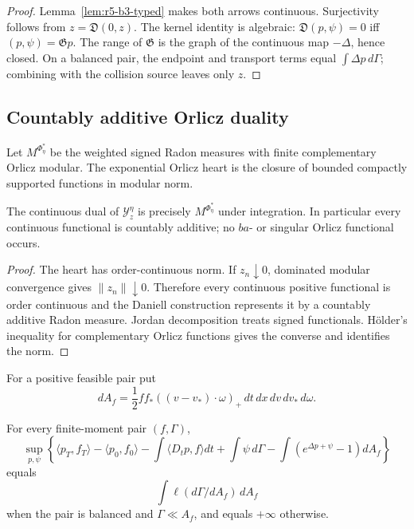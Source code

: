 \begin{proof}
Lemma~\ref{lem:r5-b3-typed} makes both arrows continuous.
Surjectivity follows from \(z={\mathfrak D}(0,z)\).  The kernel identity is
algebraic:
\({\mathfrak D}(p,\psi)=0\) iff
\((p,\psi)={\mathfrak G}p\).  The range of \({\mathfrak G}\) is the graph of
the continuous map \(-\Delta\), hence closed.  On a balanced pair, the
endpoint and transport terms equal \(\int\Delta p\,d\Gamma\); combining with
the collision source leaves only \(z\).
\end{proof}

\subsection{Countably additive Orlicz duality}

Let \(M^{\Phi_\eta^*}\) be the weighted signed Radon measures with finite
complementary Orlicz modular.  The exponential Orlicz heart is the closure of
bounded compactly supported functions in modular norm.

\begin{proposition}
\label{prop:r5-b3-orlicz}
The continuous dual of \({\mathcal Y}_z^\eta\) is precisely
\(M^{\Phi_\eta^*}\) under integration.  In particular every continuous
functional is countably additive; no \(ba\)- or singular Orlicz functional
occurs.
\end{proposition}

\begin{proof}
The heart has order-continuous norm.  If \(z_n\downarrow0\), dominated modular
convergence gives \(\|z_n\|\downarrow0\).  Therefore every continuous positive
functional is order continuous and the Daniell construction represents it by
a countably additive Radon measure.  Jordan decomposition treats signed
functionals.  H\"older's inequality for complementary Orlicz functions gives
the converse and identifies the norm.
\end{proof}

For a positive feasible pair put
\[
 dA_f=\frac12ff_*((v-v_*)\cdot\omega)_+\,dt\,dx\,dv\,dv_*\,d\omega.
\]

\begin{theorem}
\label{thm:r5-b3-duality}
For every finite-moment pair \((f,\Gamma)\),
\[
 \sup_{p,\psi}
 \left\{
 \langle p_T,f_T\rangle-\langle p_0,f_0\rangle
 -\int\langle D_tp,f\rangle dt
 +\int\psi\,d\Gamma
 -\int(e^{\Delta p+\psi}-1)dA_f
 \right\}
\]
equals
\[
 \int\ell(d\Gamma/dA_f)\,dA_f
\]
when the pair is balanced and \(\Gamma\ll A_f\), and equals \(+\infty\)
otherwise.
\end{theorem}

